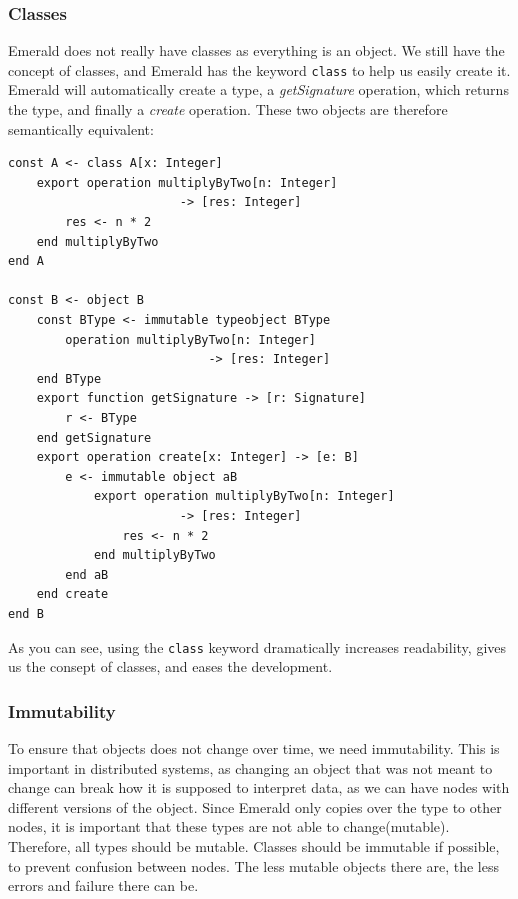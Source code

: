 \subsubsection{Classes}
Emerald does not really have classes as everything is an object. We still have the concept of classes, and Emerald has the keyword \verb|class| to help us easily create it. Emerald will automatically create a type, a \textit{getSignature} operation, which returns the type, and finally a \textit{create} operation. These two objects are therefore semantically equivalent:
\begin{lstlisting}[language=emerald]
const A <- class A[x: Integer]
    export operation multiplyByTwo[n: Integer]
                        -> [res: Integer]
        res <- n * 2
    end multiplyByTwo
end A

const B <- object B
    const BType <- immutable typeobject BType
        operation multiplyByTwo[n: Integer]
                            -> [res: Integer]
    end BType
    export function getSignature -> [r: Signature]
        r <- BType
    end getSignature
    export operation create[x: Integer] -> [e: B]
        e <- immutable object aB
            export operation multiplyByTwo[n: Integer]
                        -> [res: Integer]
                res <- n * 2
            end multiplyByTwo
        end aB
    end create
end B
\end{lstlisting}
As you can see, using the \verb|class| keyword dramatically increases readability, gives us the consept of classes, and eases the development.



\subsubsection{Immutability}
To ensure that objects does not change over time, we need immutability. This is important in distributed systems, as changing an object that was not meant to change can break how it is supposed to interpret data, as we can have nodes with different versions of the object. Since Emerald only copies over the type to other nodes, it is important that these types are not able to change(mutable). Therefore, all types should be mutable. Classes should be immutable if possible, to prevent confusion between nodes. The less mutable objects there are, the less errors and failure there can be.

